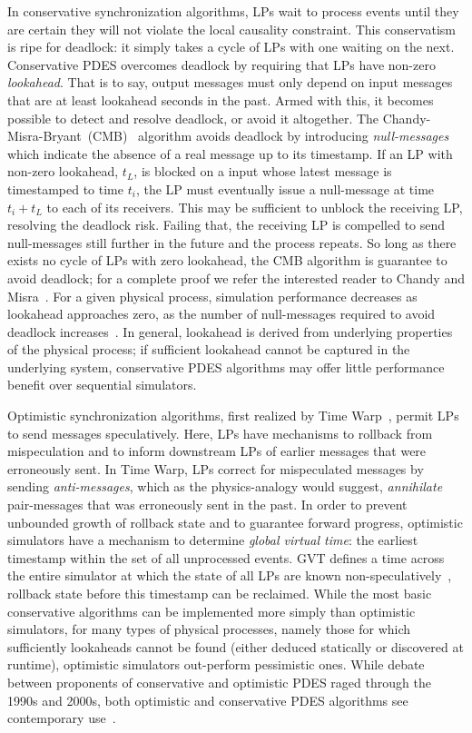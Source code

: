 In conservative synchronization algorithms, LPs wait to process events until
they are certain they will not violate the local causality constraint. This
conservatism is ripe for deadlock: it simply takes a cycle of LPs with one
waiting on the next. Conservative PDES overcomes deadlock by requiring that LPs have non-zero
\emph{lookahead}. That is to say, output messages must only depend on input
messages that are at least lookahead seconds in the past. Armed with this,
it becomes possible to detect and resolve deadlock, or avoid it altogether.
The Chandy-Misra-Bryant~(CMB)~\cite{NullMessagesBryant, NullMessagesChandy} algorithm avoids deadlock by introducing
\emph{null-messages} which indicate the absence of a real
message up to its timestamp. If an LP with non-zero lookahead, $t_{L}$, is blocked on a input whose latest
message is timestamped to time $t_{i}$, the LP must eventually issue a
null-message at time $t_{i} + t_{L}$ to each of its receivers. This may
be sufficient to unblock the receiving LP, resolving the deadlock risk. Failing that, the receiving LP is compelled to
send null-messages still further in the future and the process repeats.
So long as there exists no cycle of LPs with zero lookahead, the CMB algorithm
is guarantee to avoid deadlock; for a complete proof we refer the interested reader to Chandy and Misra~\cite{NullMessagesChandy}.
For a given physical process, simulation performance decreases as lookahead approaches zero, as the number
of null-messages required to avoid deadlock increases~\cite{PDESFujimotoPrimer}.
In general, lookahead is derived from underlying properties of the
physical process; if sufficient lookahead cannot be
captured in the underlying system, conservative PDES algorithms may offer
little performance benefit over sequential simulators.

Optimistic synchronization algorithms, first realized by Time Warp~\cite{TimeWarp}, permit
LPs to send messages speculatively.  Here, LPs have mechanisms to rollback from
mispeculation and to inform downstream LPs of earlier messages that were
erroneously sent. In Time Warp, LPs correct for mispeculated messages by
sending \emph{anti-messages}, which as the physics-analogy would suggest,
\emph{annihilate} pair-messages that was erroneously sent
in the past. In order to prevent unbounded growth of rollback state and to
guarantee forward progress, optimistic simulators have a mechanism to determine
\emph{global virtual time}: the earliest timestamp within the set of all
unprocessed events. GVT defines a time across the entire simulator at which
the state of all LPs are known non-speculatively~\cite{TimeWarp},
rollback state before this timestamp can be reclaimed. While the most
basic conservative algorithms can be implemented more simply than optimistic
simulators, for many types of physical processes, namely those for which
sufficiently lookaheads cannot be found (either deduced statically or discovered
at runtime), optimistic simulators out-perform pessimistic ones. While debate between proponents of conservative and optimistic PDES raged through
the 1990s and 2000s, both optimistic and conservative PDES algorithms see
contemporary use~\cite{PDESRetrospective}.


